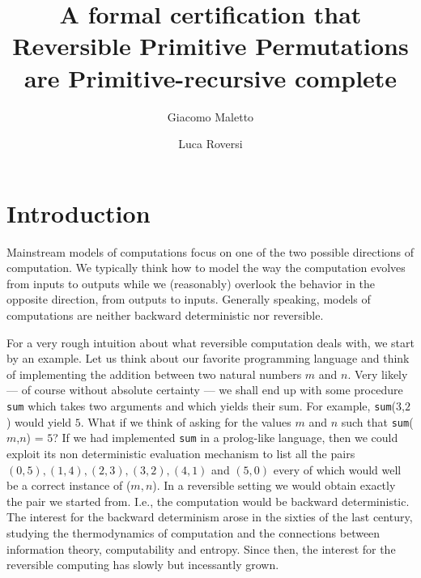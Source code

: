 \documentclass[runningheads]{llncs}
\begin{document}
\title{A formal certification that Reversible Primitive Permutations are Primitive-recursive complete}

\author{Giacomo Maletto \and
	    Luca Roversi}



\maketitle
\begin{abstract}
\end{abstract}

\section{Introduction}
\label{section:Introduction}

Mainstream models of computations focus on one of the two possible directions of computation.
We typically think how to model
the way the computation evolves from inputs to outputs while
we (reasonably) overlook the behavior in the opposite direction, from outputs to inputs.
Generally speaking, models of computations are neither backward deterministic nor reversible.

For a very rough intuition about what reversible computation deals with, we start by an example.
Let us think about our favorite programming language and think of implementing the
addition between two natural numbers
$ m $ and $ n $. Very likely --- of course without absolute certainty --- we
shall end up with some procedure \texttt{sum} which takes two arguments and which yields their sum.
For example, \texttt{sum}($ 3 $,$ 2 $) would yield $ 5 $.
What if we think of asking for the values $ m $ and $ n $ such that \texttt{sum}($ m $,$ n $) = $ 5 $?
If we had implemented \texttt{sum} in a prolog-like language, then we could exploit its
non deterministic evaluation mechanism to list all the pairs $ (0,5), (1,4), (2,3), (3,2), (4,1) $ and
$ (5,0) $ every of which would well be a correct instance of ($ m, n $).
In a reversible setting we would obtain
exactly the pair we started from. I.e., the computation would be backward deterministic.
The interest for the backward determinism arose in the sixties of the last century,
studying the thermodynamics of computation and the connections between information theory, computability and entropy.
Since then, the interest for the reversible computing has slowly but incessantly grown.
\end{document}
